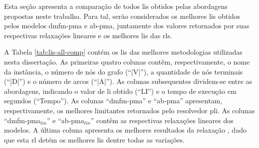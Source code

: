 Esta seção  apresenta a comparação  de todos \gls{li}s obtidos  pelas abordagens
propostas neste  trabalho. Para  tal, serão  considerados os  melhores \gls{li}s
obtidos  pelos modelos  \gls{dmfm-pma}  e \gls{ab-pma},  juntamente dos  valores
retornados por suas respectivas relaxações  lineares e os melhores \gls{li}s das
\gls{rl}s.

A Tabela  \ref{tab:lis-all-comp} contém  os \gls{li}s das  melhores metodologias
utilizadas   nesta   dissertação.   As    primeiras   quatro   colunas   contêm,
respectivamente, o  nome da  instância, o  número de nós  do grafo  (``|V|''), a
quantidade de nós terminais (``|D|'') e  o número de arcos (``|A|''). As colunas
subsequentes  dividem-se entre  as  abordagens, indicando  o  valor de  \gls{li}
obtido  (``LI'') e  o  tempo de  execução em  segundos  (``Tempo''). As  colunas
``\gls{dmfm-pma}'' e  ``\gls{ab-pma}'' apresentam, respectivamente,  os melhores
limitantes     retornados    pelo     resolvedor    \gls{pli}.     As    colunas
``\gls{dmfm-pma}$_{lin}$''  e  ``\gls{ab-pma}$_{lin}$''  contêm  as  respectivas
relaxações  lineares  dos  modelos.  A   última  coluna  apresenta  os  melhores
resultados  da  relaxação {\rlq},  dado  que  esta  \gls{rl} detém  os  melhores
\gls{li}s dentre todas as variações.

